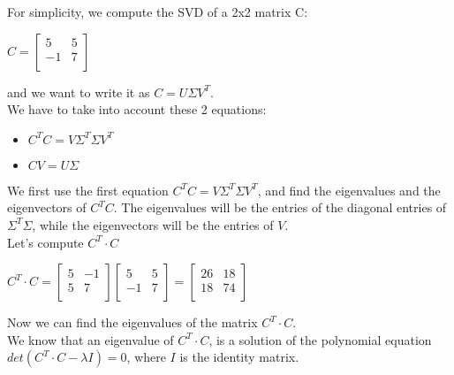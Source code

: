For simplicity, we compute the SVD of a 2x2 matrix C:
\begin{center}
	$ 
	C=\begin{bmatrix}
	5 &   5 \\
-1  &  7 \\
	\end{bmatrix}$
\end{center}
and we want to write it as $ C=U\Sigma V^{T} $.\\
We have to take into account these 2 equations:
\begin{itemize}
	\item $ C^T C = V\Sigma^T\Sigma V^T$
	\item $CV=U\Sigma$
\end{itemize}
We first use the first equation  $ C^T C = V\Sigma^T\Sigma V^T$, and find the eigenvalues and the eigenvectors of $C^T C $.
The eigenvalues will be the entries of the diagonal entries of $ \Sigma^T\Sigma $, while the eigenvectors will be the entries of $ V $.\\
Let's compute $ C^T \cdot C $\\
\begin{center}
	$ C^T \cdot C =\begin{bmatrix}
5 &   -1 \\
5  &  7 \\
\end{bmatrix}\begin{bmatrix}
5 &   5 \\
-1  &  7 \\
\end{bmatrix}=\begin{bmatrix}
26 &   18 \\
18  &  74 \\
\end{bmatrix}$\\
\end{center}
Now we can find the eigenvalues of the matrix $ C^T \cdot C $.\\
We know that an eigenvalue of $ C^T \cdot C $, is a solution of the polynomial equation $det( C^T \cdot C-\lambda I)=0 $, where $ I $ is the identity matrix.\\
